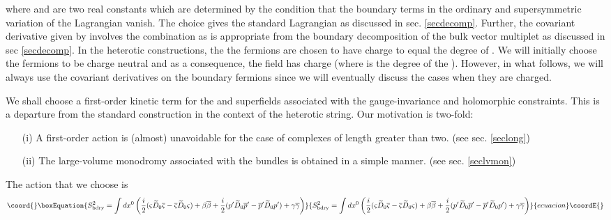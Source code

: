 \documentclass[a4paper,12pt]{article}
\begin{document}
where \coordHE{} and \coordHE{} are two real constants which are determined by the
condition that the boundary terms in the ordinary and supersymmetric
variation of the Lagrangian
\coordHE{}  vanish. The choice \coordHE{}
gives the standard \coordHE{} Lagrangian as discussed in sec.
\ref{secdecomp}.
Further, the covariant derivative given by
\coordHE{} involves the combination
\coordHE{}
as is appropriate from the boundary decomposition of
the bulk vector multiplet as discussed in sec \ref{secdecomp}. 
In the heterotic \coordHE{} constructions, the
the fermions \coordHE{} are chosen to have charge
to equal the degree of \coordHE{}. We will  initially choose the fermions to
be charge neutral and as a consequence, the \coordHE{} field has charge
\coordHE{} (where \coordHE{} is the degree of the \coordHE{}). However, in what
follows, we will always use the covariant derivatives on the boundary
fermions since we will eventually discuss the cases when they are
charged.

We shall choose a first-order kinetic term for the \coordHE{} and \coordHE{}
superfields associated with the gauge-invariance  and holomorphic
constraints. This is a departure from the standard \coordHE{} construction
in the context of the heterotic string. Our motivation is two-fold: 
\begin{itemize}
\item[(i)] A first-order action is (almost) unavoidable for the case of
complexes of length greater than two. (see sec. \ref{seclong})
\item[(ii)] The large-volume monodromy associated with the bundles is obtained
in a simple manner. (see sec. \ref{seclvmon})
\end{itemize}
The action that we choose is
\begin{equation}\coord{}\boxEquation{
S^2_{\rm bdry} = \int dx^0 \left(
{i\over2} (\varsigma \widetilde{D}_0 \overline{\varsigma} -
\overline{\varsigma} \widetilde{D}_0 \varsigma) + \beta \overline{\beta}
+ {i\over2} (p' \widetilde{D}_0 \overline{p}' -
\overline{p}' \widetilde{D}_0 p') + \gamma \overline{\gamma}
\right)
}{
S^2_{\rm bdry} = \int dx^0 \left(
{i\over2} (\varsigma \widetilde{D}_0 \overline{\varsigma} -
\overline{\varsigma} \widetilde{D}_0 \varsigma) + \beta \overline{\beta}
+ {i\over2} (p' \widetilde{D}_0 \overline{p}' -
\overline{p}' \widetilde{D}_0 p') + \gamma \overline{\gamma}
\right)
}{ecuacion}\coordE{}\end{equation}
\end{document}
